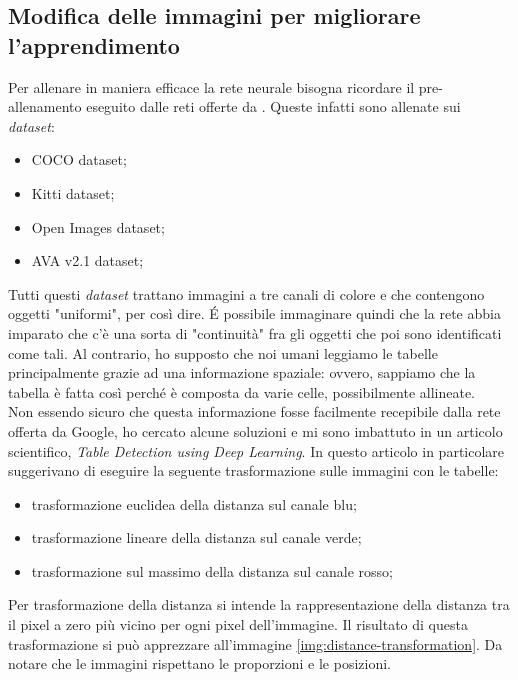     \subsection{Modifica delle immagini per migliorare l'apprendimento}
    Per allenare in maniera efficace la rete neurale bisogna ricordare il pre-allenamento eseguito dalle reti offerte da . Queste infatti sono allenate sui \textit{dataset}:
    \begin{itemize}
        \item COCO dataset\cite{site:coco-dataset};
        \item Kitti dataset\cite{site:kitti-dataset};
        \item Open Images dataset\cite{site:open-images-dataset};
        \item AVA v2.1 dataset\cite{site:ava-dataset};
    \end{itemize}
    Tutti questi \textit{dataset} trattano immagini a tre canali di colore e che contengono oggetti "uniformi", per così dire. \'E possibile immaginare quindi che la rete abbia imparato che c'è una sorta di "continuità" fra gli oggetti che poi sono identificati come tali. Al contrario, ho supposto che noi umani leggiamo le tabelle principalmente grazie ad una informazione spaziale: ovvero, sappiamo che la tabella è fatta così perché è composta da varie celle, possibilmente allineate. 
    \medskip
    \\Non essendo sicuro che questa informazione fosse facilmente recepibile dalla rete offerta da Google, ho cercato alcune soluzioni e mi sono imbattuto in un articolo scientifico, \textit{Table Detection using Deep Learning}\cite{article:table-detection-using-dl}. In questo articolo in particolare suggerivano di eseguire la seguente trasformazione\cite{site:distance-transform} sulle immagini con le tabelle:
    \begin{itemize}
        \item trasformazione euclidea della distanza sul canale blu;
        \item trasformazione lineare della distanza sul canale verde;
        \item trasformazione sul massimo della distanza sul canale rosso;
    \end{itemize}
    Per trasformazione della distanza si intende la rappresentazione della distanza tra il pixel a zero più vicino per ogni pixel dell'immagine.
    Il risultato di questa trasformazione si può apprezzare all'immagine \ref{img:distance-transformation}. Da notare che le immagini rispettano le proporzioni e le posizioni.
